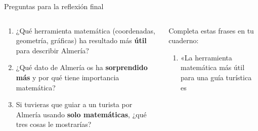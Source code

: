 \documentclass[aspectratio=169, 10pt, spanish]{beamer}
\begin{document}

\begin{frame}{Preguntas para la reflexión final}
  \begin{columns}[T]
    \begin{column}{0.48\textwidth}
      \begin{tcolorbox}[
        enhanced, colback=AlmAmbar!10, colframe=AlmAmbar!70!black,
        title={\faBrain\enskip Reflexiones matemáticas},
        fonttitle=\bfseries\AlmFontSmall\color{AlmAzul},
        attach boxed title to top left={yshift=-2.2mm, xshift=4mm},
        boxed title style={colback=AlmAmbar, coltext=AlmAzul, arc=3pt},
        arc=4pt]
        \AlmFontSmall
        \begin{enumerate}
          \item ¿Qué herramienta matemática
                (coordenadas, geometría, gráficas)
                ha resultado más \textbf{útil} para
                describir Almería?
          \vspace{4pt}
          \item ¿Qué dato de Almería os ha
                \textbf{sorprendido más} y por qué
                tiene importancia matemática?
          \vspace{4pt}
          \item Si tuvieras que guiar a un turista
                por Almería usando \textbf{solo matemáticas},
                ¿qué tres cosas le mostrarías?
        \end{enumerate}
      \end{tcolorbox}
    \end{column}
    \begin{column}{0.48\textwidth}
      \begin{tcolorbox}[
        enhanced, colback=AlmAzulM!10, colframe=AlmAzulM,
        title={\faStar\enskip Tarjeta de cierre},
        fonttitle=\bfseries\AlmFontSmall\color{AlmBlanco},
        attach boxed title to top left={yshift=-2.2mm, xshift=4mm},
        boxed title style={colback=AlmAzulM, arc=3pt},
        arc=4pt]
        \AlmFontSmall
        Completa estas frases en tu cuaderno:
        \begin{enumerate}
          \item «La herramienta matemática más útil
                para una guía turística es
                \underline{\hspace{2cm}}

\end{enumerate}
\end{tcolorbox}
\end{column}
\end{columns}
\end{frame}
\end{document}
